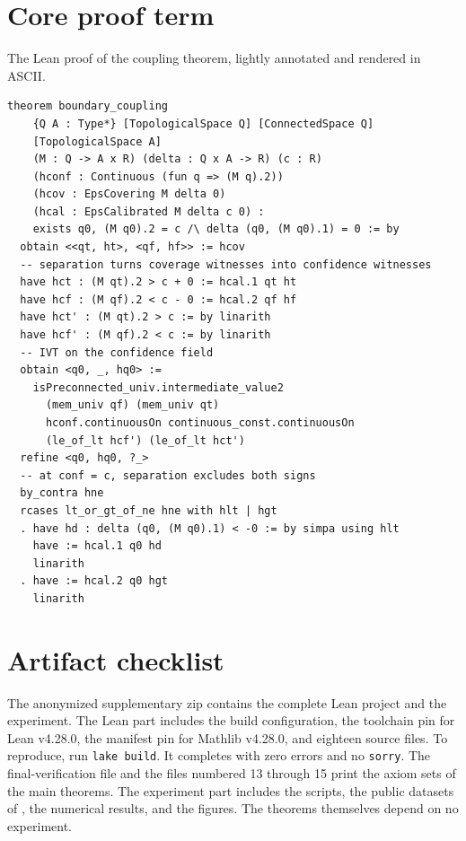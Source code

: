 \documentclass[mlmain,onecolumn]{jmlr}
\begin{document}
\section{Core proof term}
\label{app:leanproof}

The Lean proof of the coupling theorem, lightly annotated and
rendered in
ASCII.

\begin{verbatim}
theorem boundary_coupling
    {Q A : Type*} [TopologicalSpace Q] [ConnectedSpace Q]
    [TopologicalSpace A]
    (M : Q -> A x R) (delta : Q x A -> R) (c : R)
    (hconf : Continuous (fun q => (M q).2))
    (hcov : EpsCovering M delta 0)
    (hcal : EpsCalibrated M delta c 0) :
    exists q0, (M q0).2 = c /\ delta (q0, (M q0).1) = 0 := by
  obtain <<qt, ht>, <qf, hf>> := hcov
  -- separation turns coverage witnesses into confidence witnesses
  have hct : (M qt).2 > c + 0 := hcal.1 qt ht
  have hcf : (M qf).2 < c - 0 := hcal.2 qf hf
  have hct' : (M qt).2 > c := by linarith
  have hcf' : (M qf).2 < c := by linarith
  -- IVT on the confidence field
  obtain <q0, _, hq0> :=
    isPreconnected_univ.intermediate_value2
      (mem_univ qf) (mem_univ qt)
      hconf.continuousOn continuous_const.continuousOn
      (le_of_lt hcf') (le_of_lt hct')
  refine <q0, hq0, ?_>
  -- at conf = c, separation excludes both signs
  by_contra hne
  rcases lt_or_gt_of_ne hne with hlt | hgt
  . have hd : delta (q0, (M q0).1) < -0 := by simpa using hlt
    have := hcal.1 q0 hd
    linarith
  . have := hcal.2 q0 hgt
    linarith
\end{verbatim}

\section{Artifact checklist}
\label{app:artifact}

The anonymized supplementary zip contains the complete Lean project
and the experiment. The Lean part includes the build configuration,
the toolchain pin for Lean v4.28.0, the manifest pin for Mathlib
v4.28.0, and eighteen source files. To reproduce, run
\texttt{lake build}. It completes with zero errors and no
\texttt{sorry}. The final-verification file and the files numbered
13 through 15 print the axiom sets of the main theorems. The
experiment part includes the scripts, the public datasets of
\citet{marks2024geometry}, the numerical results, and the figures.
The theorems themselves depend on no experiment.
\end{document}
